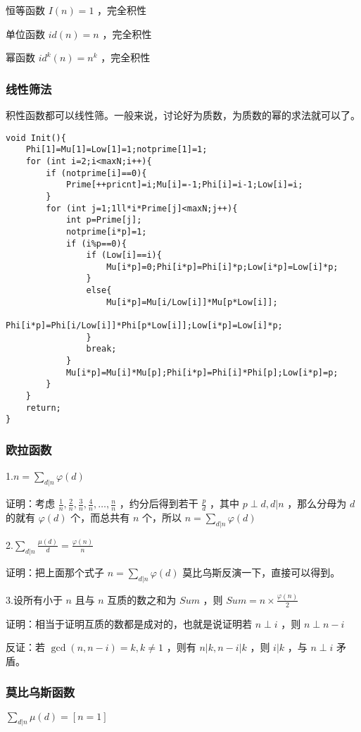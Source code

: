 \documentclass[UTF-8]{ctexart}
\begin{document}
	恒等函数 $I(n)=1$ ，完全积性  
	
	单位函数 $id(n)=n$ ，完全积性  
	
	幂函数 $id ^ k (n)=n ^ k$ ，完全积性
	\subsubsection{线性筛法}
	积性函数都可以线性筛。一般来说，讨论好为质数，为质数的幂的求法就可以了。
\begin{verbatim}
void Init(){
    Phi[1]=Mu[1]=Low[1]=1;notprime[1]=1;
    for (int i=2;i<maxN;i++){
        if (notprime[i]==0){
            Prime[++pricnt]=i;Mu[i]=-1;Phi[i]=i-1;Low[i]=i;
        }
        for (int j=1;1ll*i*Prime[j]<maxN;j++){
            int p=Prime[j];
            notprime[i*p]=1;
            if (i%p==0){
                if (Low[i]==i){
                    Mu[i*p]=0;Phi[i*p]=Phi[i]*p;Low[i*p]=Low[i]*p;
                }
                else{
                    Mu[i*p]=Mu[i/Low[i]]*Mu[p*Low[i]];
                    Phi[i*p]=Phi[i/Low[i]]*Phi[p*Low[i]];Low[i*p]=Low[i]*p;
                }
                break;
            }
            Mu[i*p]=Mu[i]*Mu[p];Phi[i*p]=Phi[i]*Phi[p];Low[i*p]=p;
        }
    }
    return;
}
\end{verbatim}
	\subsubsection{欧拉函数}
	1.$n=\sum _ {d|n} \varphi(d)$
	
	证明：考虑 $\frac{1}{n},\frac{2}{n},\frac{3}{n},\frac{4}{n},\dots,\frac{n}{n}$ ，约分后得到若干 $\frac{p}{d}$ ，其中 $p \perp d,d|n$ ，那么分母为 $d$ 的就有 $\varphi(d)$ 个，而总共有 $n$ 个，所以 $n=\sum _ {d|n} \varphi(d)$
	
	2.$\sum _ {d|n} \frac{\mu(d)}{d}=\frac{\varphi(n)}{n}$
	
	证明：把上面那个式子 $n=\sum _ {d|n} \varphi(d)$ 莫比乌斯反演一下，直接可以得到。
	
	3.设所有小于 $n$ 且与 $n$ 互质的数之和为 $Sum$ ，则 $Sum=n \times \frac{\varphi(n)}{2}$
	
	证明：相当于证明互质的数都是成对的，也就是说证明若 $n \perp i$ ，则 $n \perp n-i$ 
	 
	反证：若 $\gcd(n,n-i)=k,k \neq 1$ ，则有 $n|k,n-i|k$ ，则 $i|k$ ，与 $n \perp i$ 矛盾。
	\subsubsection{莫比乌斯函数}
	$\sum _ {d|n} \mu(d)=[n=1]$ 
	
\end{document}
